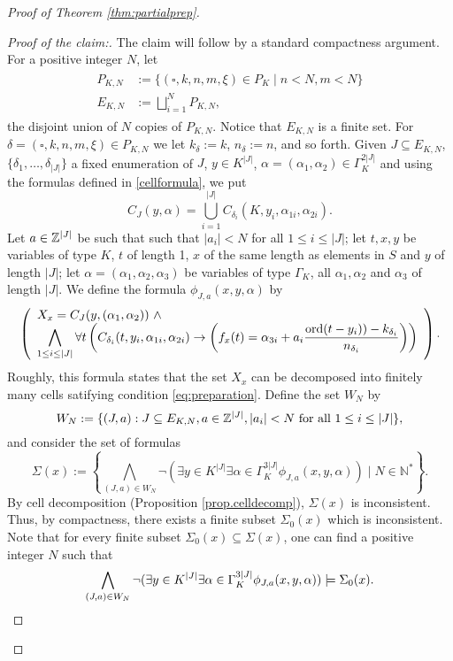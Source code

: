 \begin{proof}[Proof of Theorem \ref{thm:partialprep}]
\begin{proof}[Proof of the claim:]
The claim will follow by a standard compactness argument. For a positive integer $N$, let 
\begin{align}\label{defPK}
\begin{split}
P_{K,N}&:= \{(\square, k,n,m,\xi)\in P_K \mid n<N, m<N\}\\
E_{K,N} &:= \bigsqcup_{i=1}^N P_{K,N},
\end{split}
\end{align}
the disjoint union of $N$ copies of $P_{K,N}$. Notice that $E_{K,N}$ is a finite set. For $\delta=(\square, k,n,m,\xi)\in P_{K,N}$ we let $k_{\delta}:=k$, $n_\delta:=n$, and so forth. Given $J\subseteq E_{K,N}$, $\{\delta_1,\ldots,\delta_{|J|}\}$ a fixed enumeration of $J$, $y\in K^{|J|}$, $\alpha=(\alpha_1,\alpha_2)\in \Gamma_K^{2|J|}$ and using the formulas defined in \ref{cellformula}, we put 
\[C_J(y,\alpha)=\bigcup_{i=1}^{|J|} C_{\delta_i}(K,y_i,\alpha_{1i},\alpha_{2i}).
\]
Let $a\in{\mathbb Z}^{|J|}$ be such that such that $|a_i|<N$ for all $1\leq i\leq |J|$; let $t,x,y$ be variables of type $K$, $t$ of length 1, $x$ of the same length as elements in $S$ and $y$ of length $|J|$; let $\alpha=(\alpha_1,\alpha_2,\alpha_3)$ be variables of type $\Gamma_K$, all $\alpha_1,\alpha_2$ and $\alpha_3$ of length $|J|$. We define the formula $\phi_{J,a}(x,y,\alpha)$
by
\small
\begin{equation}\label{cellformula}
\left(\begin{array}{l}
X_x=C_J(y,(\alpha_1,\alpha_2))\ \wedge \\
\displaystyle\bigwedge_{1\leq i\leq |J|} \forall t \left( C_{\delta_i}(t,y_i,\alpha_{1i},\alpha_{2i})\to \left(f_x(t)=\alpha_{3i}+a_i\frac{\operatorname{ord}(t-y_i))-k_{\delta_i}}{n_{\delta_i}}\right)\right)\end{array}\right).\\
\end{equation}
Roughly, this formula states that the set $X_x$ can be decomposed into finitely many cells satifying condition \ref{eq:preparation}. Define the set $W_N$ by 
\begin{equation}\label{WN}
W_N:=\{(J,a): J\subseteq E_{K,N}, a\in {\mathbb Z}^{|J|}, |a_i|<N \text{ for all } 1\leq i\leq |J|\},
\end{equation}
and consider the set of formulas 
\[\Sigma(x):=\left\{ \bigwedge_{(J,a)\in W_N} \neg (\exists y\in K^{|J|}\exists \alpha\in \Gamma_{K}^{3|J|}\phi_{J,a}(x,y,\alpha)) \mid N\in\mathbb{N}^*\right\}.
\]
By cell decomposition (Proposition \ref{prop.celldecomp}), $\Sigma(x)$ is inconsistent. Thus, by compactness, there exists a finite subset $\Sigma_0(x)$ which is inconsistent. Note that for every finite subset $\Sigma_0(x)\subseteq\Sigma(x)$, one can find a positive integer $N$ such that 
\[\bigwedge_{(J,a)\in W_N} \neg (\exists y\in K^{|J|}\exists \alpha\in \Gamma_{K}^{3|J|}\phi_{J,a}(x,y,\alpha)) \models \Sigma_0(x).
\end{equation*}

\]
\end{proof}
\end{proof}
